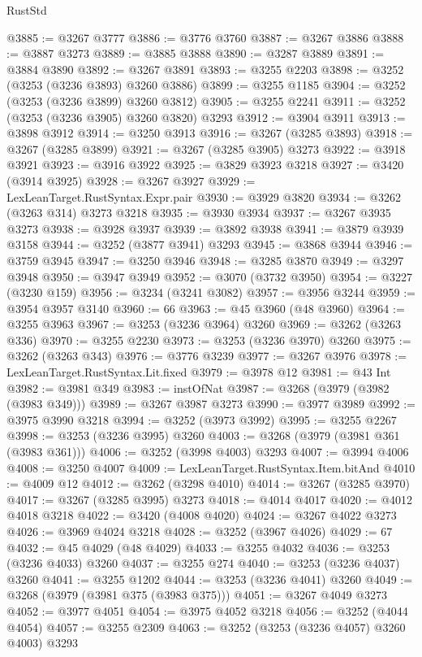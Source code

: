 \begin{lexlean}{RustStd}
\begin{coremodule}
{\begin{coremodule}
{{{{{{{{{{{{{{{{{{{{{{{{{{{{{{{{{{{{{{{@3885 := @3267 @3777
@3886 := @3776 @3760
@3887 := @3267 @3886
@3888 := @3887 @3273
@3889 := @3885 @3888
@3890 := @3287 @3889
@3891 := @3884 @3890
@3892 := @3267 @3891
@3893 := @3255 @2203
@3898 := @3252 (@3253 (@3236 @3893) @3260 @3886)
@3899 := @3255 @1185
@3904 := @3252 (@3253 (@3236 @3899) @3260 @3812)
@3905 := @3255 @2241
@3911 := @3252 (@3253 (@3236 @3905) @3260 @3820) @3293
@3912 := @3904 @3911
@3913 := @3898 @3912
@3914 := @3250 @3913
@3916 := @3267 (@3285 @3893)
@3918 := @3267 (@3285 @3899)
@3921 := @3267 (@3285 @3905) @3273
@3922 := @3918 @3921
@3923 := @3916 @3922
@3925 := @3829 @3923 @3218
@3927 := @3420 (@3914 @3925)
@3928 := @3267 @3927
@3929 := LexLeanTarget.RustSyntax.Expr.pair
@3930 := @3929 @3820
@3934 := @3262 (@3263 @314) @3273 @3218
@3935 := @3930 @3934
@3937 := @3267 @3935 @3273
@3938 := @3928 @3937
@3939 := @3892 @3938
@3941 := @3879 @3939 @3158
@3944 := @3252 (@3877 @3941) @3293
@3945 := @3868 @3944
@3946 := @3759 @3945
@3947 := @3250 @3946
@3948 := @3285 @3870
@3949 := @3297 @3948
@3950 := @3947 @3949
@3952 := @3070 (@3732 @3950)
@3954 := @3227 (@3230 @159)
@3956 := @3234 (@3241 @3082)
@3957 := @3956 @3244
@3959 := @3954 @3957 @3140
@3960 := 66
@3963 := @45 @3960 (@48 @3960)
@3964 := @3255 @3963
@3967 := @3253 (@3236 @3964) @3260
@3969 := @3262 (@3263 @336)
@3970 := @3255 @2230
@3973 := @3253 (@3236 @3970) @3260
@3975 := @3262 (@3263 @343)
@3976 := @3776 @3239
@3977 := @3267 @3976
@3978 := LexLeanTarget.RustSyntax.Lit.fixed
@3979 := @3978 @12
@3981 := @43 Int
@3982 := @3981 @349
@3983 := instOfNat
@3987 := @3268 (@3979 (@3982 (@3983 @349)))
@3989 := @3267 @3987 @3273
@3990 := @3977 @3989
@3992 := @3975 @3990 @3218
@3994 := @3252 (@3973 @3992)
@3995 := @3255 @2267
@3998 := @3253 (@3236 @3995) @3260
@4003 := @3268 (@3979 (@3981 @361 (@3983 @361)))
@4006 := @3252 (@3998 @4003) @3293
@4007 := @3994 @4006
@4008 := @3250 @4007
@4009 := LexLeanTarget.RustSyntax.Item.bitAnd
@4010 := @4009 @12
@4012 := @3262 (@3298 @4010)
@4014 := @3267 (@3285 @3970)
@4017 := @3267 (@3285 @3995) @3273
@4018 := @4014 @4017
@4020 := @4012 @4018 @3218
@4022 := @3420 (@4008 @4020)
@4024 := @3267 @4022 @3273
@4026 := @3969 @4024 @3218
@4028 := @3252 (@3967 @4026)
@4029 := 67
@4032 := @45 @4029 (@48 @4029)
@4033 := @3255 @4032
@4036 := @3253 (@3236 @4033) @3260
@4037 := @3255 @274
@4040 := @3253 (@3236 @4037) @3260
@4041 := @3255 @1202
@4044 := @3253 (@3236 @4041) @3260
@4049 := @3268 (@3979 (@3981 @375 (@3983 @375)))
@4051 := @3267 @4049 @3273
@4052 := @3977 @4051
@4054 := @3975 @4052 @3218
@4056 := @3252 (@4044 @4054)
@4057 := @3255 @2309
@4063 := @3252 (@3253 (@3236 @4057) @3260 @4003) @3293
}}}}}}}}}}}}}}}}}}}}}}}}}}}}}}}}}}}}}}}
\end{coremodule}}
\end{coremodule}
\end{lexlean}
